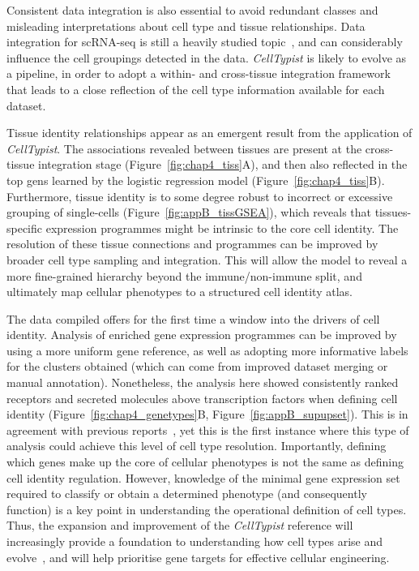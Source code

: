 Consistent data integration is also essential to avoid redundant classes and misleading interpretations about cell type and tissue relationships. Data integration for scRNA-seq is still a heavily studied topic~\citep{haghverdi_batch_2018,lopez_deep_2018,polanski_bbknn:_2019, stuart_comprehensive_2019}, and can considerably influence the cell groupings detected in the data. \textit{CellTypist} is likely to evolve as a pipeline, in order to adopt a within- and cross-tissue integration framework that leads to a close reflection of the cell type information available for each dataset.

Tissue identity relationships appear as an emergent result from the application of \textit{CellTypist}. The associations revealed between tissues are present at the cross-tissue integration stage (Figure~\ref{fig:chap4_tiss}A), and then also reflected in the top gens learned by the logistic regression model (Figure~\ref{fig:chap4_tiss}B). Furthermore, tissue identity is to some degree robust to incorrect or excessive grouping of single-cells (Figure~\ref{fig:appB_tissGSEA}), which reveals that tissues-specific expression programmes might be intrinsic to the core cell identity. The resolution of these tissue connections and programmes can be improved by broader cell type sampling and integration. This will allow the model to reveal a more fine-grained hierarchy beyond the immune/non-immune split, and ultimately map cellular phenotypes to a structured cell identity atlas.

The data compiled offers for the first time a window into the drivers of cell identity. Analysis of enriched gene expression programmes can be improved by using a more uniform gene reference, as well as adopting more informative labels for the clusters obtained (which can come from improved dataset merging or manual annotation). Nonetheless, the analysis here showed consistently ranked receptors and secreted molecules above transcription factors when defining cell identity (Figure~\ref{fig:chap4_genetypes}B, Figure~\ref{fig:appB_supupset}). This is in agreement with previous reports~\citep{sonawane_understanding_2017}, yet this is the first instance where this type of analysis could achieve this level of cell type resolution. Importantly, defining which genes make up the core of cellular phenotypes is not the same as defining cell identity regulation. However, knowledge of the minimal gene expression set required to classify or obtain a determined phenotype (and consequently function) is a key point in understanding the operational definition of cell types. Thus, the expansion and improvement of the \textit{CellTypist} reference will increasingly provide a foundation to understanding how cell types arise and evolve~\citep{zimmermann_ancient_2019}, and will help prioritise gene targets for effective cellular engineering.

